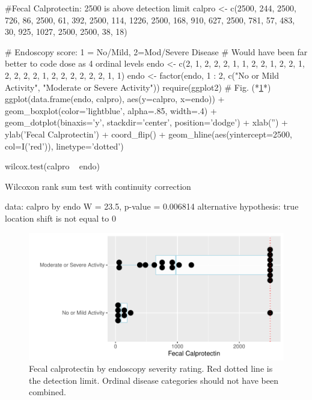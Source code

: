 \begin{Schunk}
\begin{Sinput}
#Fecal Calprotectin: 2500 is above detection limit
calpro <- c(2500, 244, 2500, 726, 86, 2500, 61, 392, 2500, 114, 1226,
            2500, 168, 910, 627, 2500, 781, 57, 483, 30, 925, 1027,
            2500, 2500, 38, 18)

# Endoscopy score: 1 = No/Mild, 2=Mod/Severe Disease
# Would have been far better to code dose as 4 ordinal levels
endo <- c(2, 1, 2, 2, 2, 1, 1, 2, 2, 1, 2, 2, 1, 2, 2, 2, 2, 1, 2,
          2, 2, 2, 2, 2, 1, 1)
endo <- factor(endo, 1 : 2,
               c("No or Mild Activity", "Moderate or Severe Activity"))
require(ggplot2)   # Fig. (*\ref{fig:nonpar-calpro}*)
ggplot(data.frame(endo, calpro), aes(y=calpro, x=endo)) +
  geom_boxplot(color='lightblue', alpha=.85, width=.4) +
  geom_dotplot(binaxis='y', stackdir='center', position='dodge') +
    xlab('') + ylab('Fecal Calprotectin') + coord_flip() +
      geom_hline(aes(yintercept=2500, col=I('red')), linetype='dotted')
\end{Sinput}
\begin{Sinput}
wilcox.test(calpro ~ endo)
\end{Sinput}
\begin{Soutput}

	Wilcoxon rank sum test with continuity correction

data:  calpro by endo
W = 23.5, p-value = 0.006814
alternative hypothesis: true location shift is not equal to 0
\end{Soutput}
\begin{figure}[htbp]

\centerline{\includegraphics[width=\maxwidth]{nonpar-calpro-1} }

\caption[Fecal calprotectin by severity]{Fecal calprotectin by endoscopy severity rating. Red dotted line is the detection limit.  Ordinal disease categories should not have been combined.}\label{fig:nonpar-calpro}
\end{figure}
\end{Schunk}
